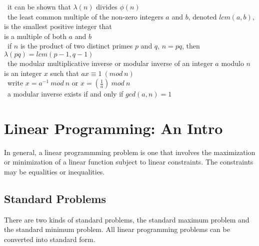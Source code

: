 \documentclass[10pt,letterpaper]{scrartcl}
\newcommand{\tbul}{\textbullet}
\newcommand{\tend}{\>\textendash}
\begin{document}
\begin{tabbing}
    \tend\ it can be shown that $\lambda (n)$ divides $\phi (n)$ \\
\tbul\ the least common multiple of the non-zero integers $a$ and $b$, denoted $lcm(a,b)$, is the smallest positive integer that \\ is a multiple of both $a$ and $b$ \\
\tbul\ if $n$ is the product of two distinct primes $p$ and $q$, $n=pq$, then $\lambda (pq)=lcm(p-1, q-1)$ \\
\tbul\ the modular multiplicative inverse or modular inverse of an integer $a$ modulo $n$ is an integer $x$ such that $ax\equiv 1\ (mod\ n)$ \\
    \tend\ write $x = a^{-1}\ mod\ n$ or $x=(\frac{1}{a})\ mod\ n$ \\
    \tend\ a modular inverse exists if and only if $gcd(a, n)=1$ \end{tabbing}

\newpage\section{Linear Programming: An Intro}
In general, a linear programmming problem is one that involves the maximization or minimization of a linear function subject to linear constraints. The constraints may be equalities or inequalities. 
\subsection{Standard Problems}
There are two kinds of standard problems, the standard maximum problem and the standard minimum problem. All linear programming problems can be converted into standard form. 
\end{document}
